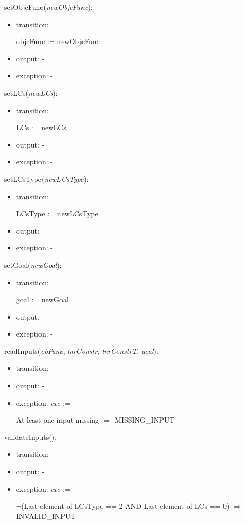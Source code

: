 \documentclass[12pt, titlepage]{article}
\begin{document}
\noindent 
setObjcFunc(\textit{newObjcFunc}):
\begin{itemize}
	\item transition: 
	
	objcFunc := newObjcFunc
	\item output: -
	\item exception: -
\end{itemize}

\noindent 
setLCs(\textit{newLCs}):
\begin{itemize}
	\item transition: 
	
	LCs := newLCs
	\item output: -
	\item exception: -
\end{itemize}

\noindent 
setLCsType(\textit{newLCsType}):
\begin{itemize}
	\item transition: 
	
	LCsType := newLCsType
	\item output: -
	\item exception: -
\end{itemize}

\noindent 
setGoal(\textit{newGoal}):
\begin{itemize}
	\item transition: 
	
	goal := newGoal
	\item output: -
	\item exception: -
\end{itemize}

\noindent 
readInputs(\textit{obFunc}, \textit{lnrConstr}, \textit{lnrConstrT}, 
\textit{goal}):
\begin{itemize}
	\item transition: -
	\item output: -
	\item exception: \textit{exc} := 
	
	At least one input missing \hspace{3.5cm} $\Rightarrow$ MISSING{\_}INPUT
\end{itemize}

\noindent 
validateInputs():
\begin{itemize}
	\item transition: -
	\item output: -
	\item exception: \textit{exc} := 
	
	$\neg$(Last element of LCsType == 2 AND  Last element of LCs == 0) 
	$\Rightarrow$ INVALID{\_}INPUT \\
	
	
\end{itemize}
\end{document}
